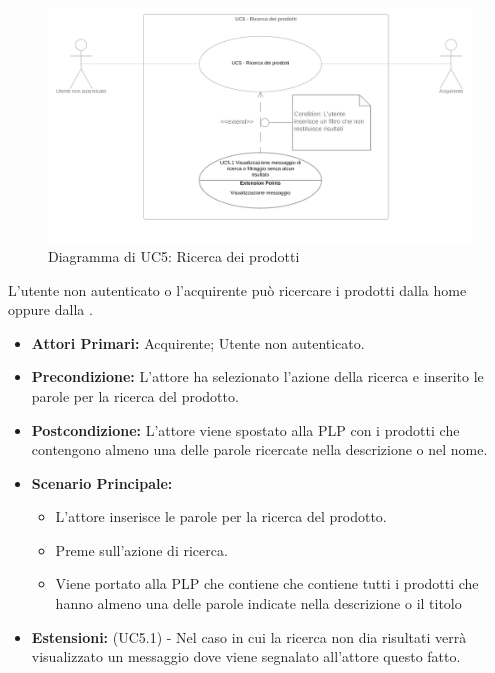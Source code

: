 
\begin{figure}[H]
    \centering
    \includegraphics[width=\textwidth]{Immagini/DiagrammiUC/UC5RicercaDeiProdotti.png}
    \caption{Diagramma di UC5: Ricerca dei prodotti} 
    \label{fig:RicercaDeiProdotti}
\end{figure}

L'utente non autenticato o l'acquirente può ricercare i prodotti dalla home oppure dalla .
\begin{itemize}
    \item \textbf{Attori Primari:} Acquirente; Utente non autenticato.
    \item \textbf{Precondizione:} L'attore ha selezionato l'azione della ricerca e inserito le parole per la ricerca del prodotto.
    \item \textbf{Postcondizione:} L'attore viene spostato alla PLP con i prodotti che contengono almeno una delle parole ricercate nella descrizione o nel nome. 
    \item \textbf{Scenario Principale:} 
    \begin{itemize}
        \item L'attore inserisce le parole per la ricerca del prodotto.
        \item Preme sull'azione di ricerca.
        \item Viene portato alla PLP che contiene che contiene tutti i prodotti che hanno almeno una delle parole indicate nella descrizione o il titolo
    \end{itemize}
    \item \textbf{Estensioni:} (UC5.1) - Nel caso in cui la ricerca non dia risultati verrà visualizzato un messaggio dove viene segnalato all'attore questo fatto.
\end{itemize}

